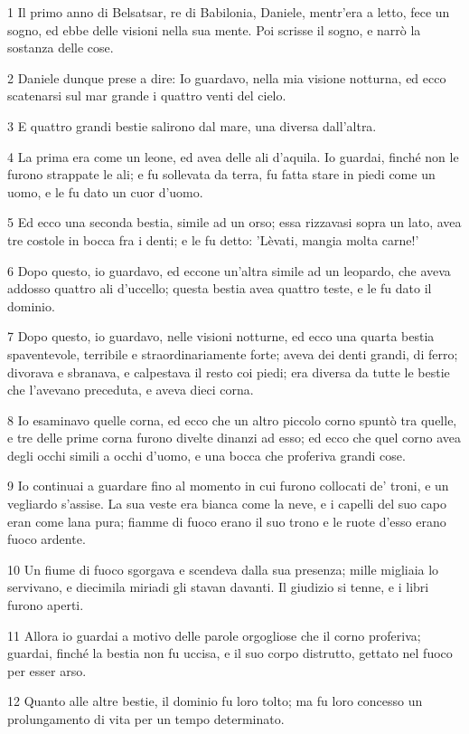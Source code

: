 \par 1 Il primo anno di Belsatsar, re di Babilonia, Daniele, mentr'era a letto, fece un sogno, ed ebbe delle visioni nella sua mente. Poi scrisse il sogno, e narrò la sostanza delle cose.
\par 2 Daniele dunque prese a dire: Io guardavo, nella mia visione notturna, ed ecco scatenarsi sul mar grande i quattro venti del cielo.
\par 3 E quattro grandi bestie salirono dal mare, una diversa dall'altra.
\par 4 La prima era come un leone, ed avea delle ali d'aquila. Io guardai, finché non le furono strappate le ali; e fu sollevata da terra, fu fatta stare in piedi come un uomo, e le fu dato un cuor d'uomo.
\par 5 Ed ecco una seconda bestia, simile ad un orso; essa rizzavasi sopra un lato, avea tre costole in bocca fra i denti; e le fu detto: 'Lèvati, mangia molta carne!'
\par 6 Dopo questo, io guardavo, ed eccone un'altra simile ad un leopardo, che aveva addosso quattro ali d'uccello; questa bestia avea quattro teste, e le fu dato il dominio.
\par 7 Dopo questo, io guardavo, nelle visioni notturne, ed ecco una quarta bestia spaventevole, terribile e straordinariamente forte; aveva dei denti grandi, di ferro; divorava e sbranava, e calpestava il resto coi piedi; era diversa da tutte le bestie che l'avevano preceduta, e aveva dieci corna.
\par 8 Io esaminavo quelle corna, ed ecco che un altro piccolo corno spuntò tra quelle, e tre delle prime corna furono divelte dinanzi ad esso; ed ecco che quel corno avea degli occhi simili a occhi d'uomo, e una bocca che proferiva grandi cose.
\par 9 Io continuai a guardare fino al momento in cui furono collocati de' troni, e un vegliardo s'assise. La sua veste era bianca come la neve, e i capelli del suo capo eran come lana pura; fiamme di fuoco erano il suo trono e le ruote d'esso erano fuoco ardente.
\par 10 Un fiume di fuoco sgorgava e scendeva dalla sua presenza; mille migliaia lo servivano, e diecimila miriadi gli stavan davanti. Il giudizio si tenne, e i libri furono aperti.
\par 11 Allora io guardai a motivo delle parole orgogliose che il corno proferiva; guardai, finché la bestia non fu uccisa, e il suo corpo distrutto, gettato nel fuoco per esser arso.
\par 12 Quanto alle altre bestie, il dominio fu loro tolto; ma fu loro concesso un prolungamento di vita per un tempo determinato.
